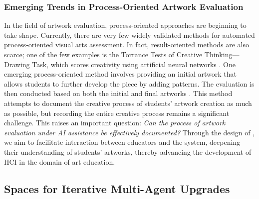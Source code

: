 \subsubsection{Emerging Trends in Process-Oriented Artwork Evaluation}
In the field of artwork evaluation, process-oriented approaches are beginning to take shape. Currently, there are very few widely validated methods for automated process-oriented visual arts assessment. In fact, result-oriented methods are also scarce; one of the few examples is the Torrance Tests of Creative Thinking—Drawing Task, which scores creativity using artificial neural networks \cite{cropley2022automated}. One emerging process-oriented method involves providing an initial artwork that allows students to further develop the piece by adding patterns. The evaluation is then conducted based on both the initial and final artworks \cite{patterson2024audra}. This method attempts to document the creative process of students' artwork creation as much as possible, but recording the entire creative process remains a significant challenge. This raises an important question: \textit{Can the process of artwork evaluation under AI assistance be effectively documented?} Through the design of \dataset, we aim to facilitate interaction between educators and the system, deepening their understanding of students' artworks, thereby advancing the development of HCI in the domain of art education.

\subsection{Spaces for Iterative Multi-Agent Upgrades}
